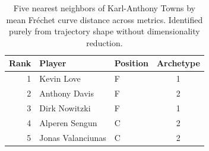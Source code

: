 \begin{table}[htbp]
  \centering\small
  \begin{tabular}{rllc}
    \toprule
    Rank & Player & Position & Archetype \\
    \midrule
    1 & Kevin Love & F & 1 \\
    2 & Anthony Davis & F & 2 \\
    3 & Dirk Nowitzki & F & 1 \\
    4 & Alperen Sengun & C & 2 \\
    5 & Jonas Valanciunas & C & 2 \\
    \bottomrule
  \end{tabular}
  \caption{Five nearest neighbors of Karl-Anthony Towns by mean Fr\'{e}chet curve distance across metrics. Identified purely from trajectory shape without dimensionality reduction.}
  \label{tab:Karl_Anthony_Towns_frechet_curve_neighbors}
\end{table}

